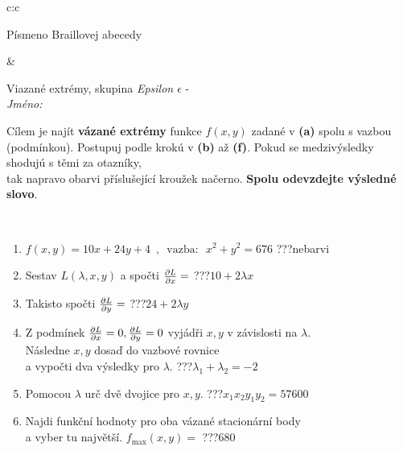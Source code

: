 \documentclass[10pt]{report}
\begin{document}
\begin{tabular}{c:c}
\begin{minipage}[c][104.5mm][t]{0.5\linewidth}
\begin{center}
\begin{minipage}{0.20\linewidth}
\begin{center}
{\small Písmeno Braillovej abecedy}
\end{center}
\end{minipage}
\end{center}
\end{minipage}
&
\begin{minipage}[c][104.5mm][t]{0.5\linewidth}
\begin{center}
\vspace{7mm}
{\huge Viazané extrémy, skupina \textit{Epsilon $\epsilon$} -}\\[5mm]
\textit{Jméno:}\phantom{xxxxxxxxxxxxxxxxxxxxxxxxxxxxxxxxxxxxxxxxxxxxxxxxxxxxxxxxxxxxxxxxx}\\[5mm]
\begin{minipage}{0.95\linewidth}
\begin{center}
Cílem je najít \textbf{vázané extrémy} funkce $f(x,y)$ zadané v \textbf{(a)} spolu s vazbou (podmínkou). Postupuj podle krokú v \textbf{(b)} až \textbf{(f)}. Pokud se medzivýsledky shodujú s těmi za otazníky,\\tak napravo obarvi příslušející kroužek načerno. \textbf{Spolu odevzdejte výsledné slovo}.
\end{center}
\end{minipage}
\\[1mm]
\begin{minipage}{0.79\linewidth}
\begin{center}
\begin{varwidth}{\linewidth}
\begin{enumerate}
\normalsize
\item $f(x,y)=10x+24y+4 \enspace , \enspace \mathrm{vazba:} \enspace x^2+y^2=676$\quad \dotfill\; ???\;\dotfill \quad nebarvi
\item Sestav $L(\lambda,x,y)$ a spočti $\pdv{L}{x}=$\quad \dotfill\; ???\;\dotfill \quad $10+2\lambda x$
\item Takisto spočti $\pdv{L}{y}=$\quad \dotfill\; ???\;\dotfill \quad $24+2\lambda y$
\item Z podmínek $\pdv{L}{x}=0 , \pdv{L}{y}=0$ vyjádři $x,y$ v závislosti na $\lambda$.\\ \phantom{xxxxxx}Následne $x,y$ dosaď do vazbové rovnice\\ \phantom{xxxxxx}a vypočti dva výsledky pro $\lambda$.\quad \dotfill\; ???\;\dotfill \quad $\lambda_1+\lambda_2=-2$
\item Pomocou $\lambda$ urč dvě dvojice pro $x,y$.\quad \dotfill\; ???\;\dotfill \quad $x_1 x_2 y_1 y_2=57600$
\item Najdi funkční hodnoty pro oba vázané stacionární body\\ \phantom{xxxxxx}a vyber tu najvětší. $f_{\text{max}}(x,y)=$\quad \dotfill\; ???\;\dotfill \quad $680$

\end{enumerate}
\end{varwidth}
\end{center}
\end{minipage}
\end{center}
\end{minipage}
\end{tabular}
\end{document}
